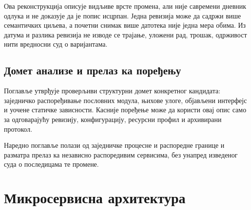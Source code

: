 \documentclass[12pt,oneside]{memoir}
\begin{document}

Ова реконструкција описује видљиве врсте промена, али није савремени дневник
одлука и не доказује да је попис исцрпан. Једна ревизија може да садржи више
семантичких циљева, а почетни снимак више датотека није једна мера обима.
Из датума и разлика ревизија не изводе се трајање, уложени рад, трошак,
одрживост нити вредносни суд о варијантама.


\section{Домет анализе и прелаз ка поређењу}

Поглавље утврђује проверљиви структурни домет конкретног кандидата: заједничко
распоређивање пословних модула, њихове улоге, објављени интерфејс и уочене
статичке зависности. Касније поређење може да користи овај опис само за
одговарајућу ревизију, конфигурацију, ресурсни профил и архивирани протокол.

Наредно поглавље полази од заједничке процесне и распоредне границе и разматра
прелаз ка независно распоредивим сервисима, без унапред изведеног суда о
последицама те промене.

\endgroup

\chapter{Микросервисна архитектура}
\label{chp:mikroservisna-arhitektura}
\end{document}
